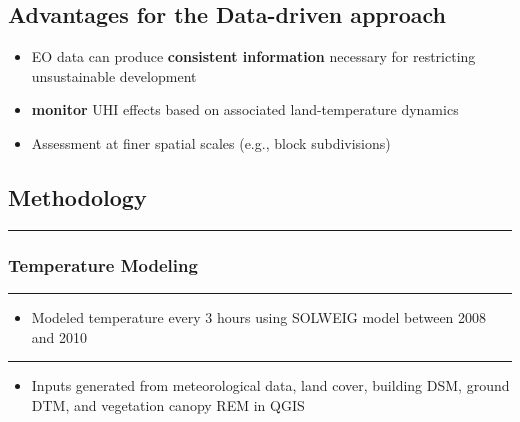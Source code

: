 \documentclass[
  letterpaper,
  DIV=11,
  numbers=noendperiod]{scrreprt}
\providecommand{\tightlist}{%
  \setlength{\itemsep}{0pt}\setlength{\parskip}{0pt}}\usepackage{longtable,booktabs,array}
\begin{document}
\hypertarget{advantages-for-the-data-driven-approach}{%
\subsection{Advantages for the Data-driven
approach}\label{advantages-for-the-data-driven-approach}}

\begin{itemize}
\tightlist
\item
  EO data can produce \textbf{consistent information} necessary for
  restricting unsustainable development
\item
  \textbf{monitor} UHI effects based on associated land-temperature
  dynamics
\item
  Assessment at finer spatial scales (e.g., block subdivisions)
\end{itemize}

\hypertarget{methodology}{%
\subsection{Methodology}\label{methodology}}

\begin{center}\rule{0.5\linewidth}{0.5pt}\end{center}

\hypertarget{temperature-modeling}{%
\subsubsection{Temperature Modeling}\label{temperature-modeling}}

\begin{center}\rule{0.5\linewidth}{0.5pt}\end{center}

\begin{itemize}
\tightlist
\item
  Modeled temperature every 3 hours using SOLWEIG model between 2008 and
  2010
\end{itemize}

\begin{center}\rule{0.5\linewidth}{0.5pt}\end{center}

\begin{itemize}
\tightlist
\item
  Inputs generated from meteorological data, land cover, building DSM,
  ground DTM, and vegetation canopy REM in QGIS
\end{itemize}
\end{document}
